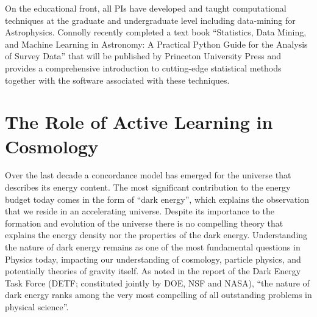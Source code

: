 \documentclass[prd,nofootbib,floatfix,11pt,tightenlines]{revtex4}
\begin{document}
On the educational front, all PIs have developed and taught computational techniques at the
graduate and undergraduate level including data-mining for
Astrophysics. Connolly recently completed a text book ``Statistics,
Data Mining, and Machine Learning in Astronomy: A Practical Python
Guide for the Analysis of Survey Data'' that will be published by
Princeton University Press and provides a comprehensive introduction
to cutting-edge statistical methods together with the software
associated with these techniques. 
%

\section{The Role of Active Learning in Cosmology}

Over the last decade a concordance model has emerged for the universe
that describes its energy content. The most significant contribution
to the energy budget today comes in the form of ``dark energy'', which
explains the observation that we reside in an accelerating
universe. Despite its importance to the formation and evolution of the
universe there is no compelling theory that explains the energy
density nor the properties of the dark energy. Understanding the
nature of dark energy remains as one of the most fundamental questions
in Physics today, impacting our understanding of cosmology, particle
physics, and potentially theories of gravity itself.  As noted in the 
report of the Dark Energy Task Force (DETF; constituted jointly by
DOE, NSF and NASA), ``the nature of dark energy ranks among the very
most compelling of all outstanding problems in physical science''.
\end{document}
